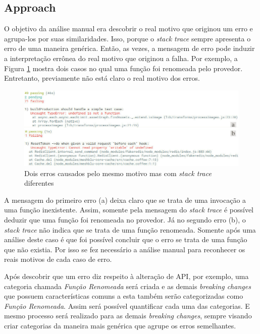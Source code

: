 \subsection{Approach}
\label{apr:rq2}

O objetivo da análise manual era descobrir o real motivo que originou um erro e agrupa-los por suas similaridades. Isso, porque o \textit{stack trace} sempre apresenta o erro de uma maneira genérica. Então, as vezes, a mensagem de erro pode induzir a interpretação errônea do real motivo que originou a falha. Por exemplo, a Figura \ref{fig:error_category} mostra dois casos no qual uma função foi renomeada pelo provedor. Entretanto, previamente não está claro o real motivo dos erros.

\begin{figure}[!h]
    \centering
    \includegraphics[scale=0.5]{figuras/error_category.jpeg}
    \caption{Dois erros causados pelo mesmo motivo mas com \textit{stack trace} diferentes}
    \label{fig:error_category}
\end{figure}

A mensagem do primeiro erro (a) deixa claro que se trata de uma invocação a uma função inexistente. Assim, somente pela mensagem do \textit{stack trace} é possível deduzir que uma função foi renomeada no provedor. Já no segundo erro (b), o \textit{stack trace} não indica que se trata de uma função renomeada. Somente após uma análise deste caso é que foi possível concluir que o erro se trata de uma função que não existia. Por isso se fez necessário a análise manual para reconhecer os reais motivos de cada caso de erro.

Após descobrir que um erro diz respeito à alteração de \gls{API}, por exemplo, uma categoria chamada \textit{Função Renomeada} será criada e as demais \textit{breaking changes} que possuem características comuns a esta também serão categorizadas como \textit{Função Renomeada}. Assim será possível quantificar cada uma das categorias. E mesmo processo será realizado para as demais \textit{breaking changes}, sempre visando criar categorias da maneira mais genérica que agrupe os erros semelhantes.

